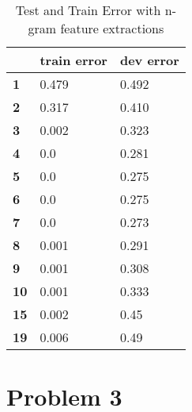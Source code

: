 \documentclass[12pt]{article}
\begin{document}
\begin{enumerate}[label=(\alph*)]
    \begin{table}[h!]
      \centering
      \begin{tabular}{|l|l|l|}
        \hline
        \textbf{}   & \textbf{train error} & \textbf{dev error} \\ \hline
        \textbf{1}  & 0.479                & 0.492              \\ \hline
        \textbf{2}  & 0.317                & 0.410              \\ \hline
        \textbf{3}  & 0.002                & 0.323              \\ \hline
        \textbf{4}  & 0.0                  & 0.281              \\ \hline
        \textbf{5}  & 0.0                  & 0.275              \\ \hline
        \textbf{6}  & 0.0                  & 0.275              \\ \hline
        \textbf{7}  & 0.0                  & 0.273              \\ \hline
        \textbf{8}  & 0.001                & 0.291              \\ \hline
        \textbf{9}  & 0.001                & 0.308              \\ \hline
        \textbf{10} & 0.001                & 0.333              \\ \hline
        \textbf{15} & 0.002                & 0.45               \\ \hline
        \textbf{19} & 0.006                & 0.49               \\ \hline
      \end{tabular}
      \caption{Test and Train Error with n-gram feature extractions}
      \label{table:n_values}
    \end{table}
\end{enumerate}

\section*{Problem 3}
\end{document}

